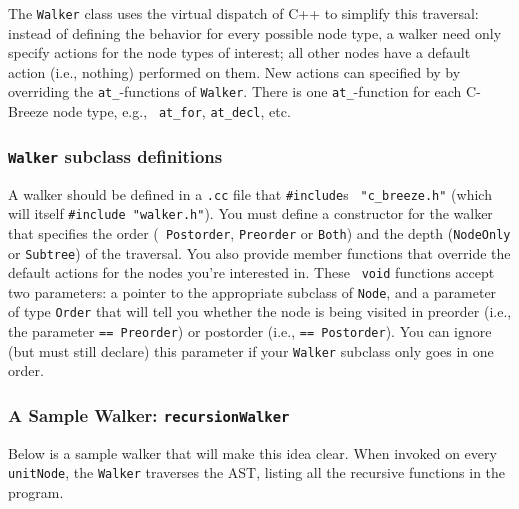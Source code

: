 \documentclass[10pt]{article}
\begin{document}
The {\tt Walker} class uses the virtual dispatch of C++ to simplify this
traversal: instead of defining the behavior for every possible node type, a
walker need only specify actions for the node types of interest; all other
nodes have a default action (i.e., nothing) performed on them.  New actions 
can specified by by overriding the {\tt at\_}-functions of {\tt Walker}.
There is one {\tt at\_}-function for each C-Breeze node type, e.g., {\tt
at\_for}, {\tt at\_decl}, etc.

\subsubsection{{\tt Walker} subclass definitions}

A walker should be defined in a {\tt .cc} file that {\tt \#include}s {\tt
"c\_breeze.h"} (which will itself {\tt \#include "walker.h"}).  You must
define a constructor for the walker that specifies the order ({\tt
Postorder}, {\tt Preorder} or {\tt Both}) and the depth ({\tt NodeOnly} or
{\tt Subtree}) of the traversal.  You also provide member functions that
override the default actions for the nodes you're interested in.  These {\tt
void} functions accept two parameters:  a pointer to the appropriate subclass
of {\tt Node}, and a parameter of type {\tt Order} that will tell you whether
the node is being visited in preorder (i.e., the parameter {\tt == Preorder})
or postorder (i.e., {\tt == Postorder}).  You can ignore (but must still
declare) this parameter if your {\tt Walker} subclass only goes in one
order.

\subsubsection{A Sample Walker: {\tt recursionWalker}}

Below is a sample walker that will make this idea clear.  When invoked
on every {\tt unitNode}, the {\tt Walker} traverses the AST, listing all the
recursive functions in the program.
\end{document}
